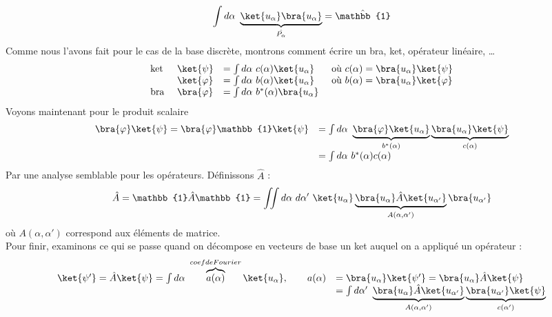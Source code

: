 \begin{equation}
\int d\alpha\ \underbrace{\ket{u_\alpha}\bra{u_\alpha}}_{\hat{P_\alpha}} = \hat{
\mathbb{1}}
\end{equation}
Comme nous l'avons fait pour le cas de la base discrète, montrons comment écrire 
un bra, ket, opérateur linéaire, \dots
\begin{equation}
\begin{array}{llll}
\text{ket } & \ket{\psi} &= \int d\alpha\ c(\alpha)\ket{u_\alpha} & \text{ où } 
c(\alpha) = \bra{u_\alpha}\ket{\psi}\\
& \ket{\varphi} &= \int d\alpha\ b(\alpha)\ket{u_\alpha} & \text{ où } b(\alpha) 
= \bra{u_\alpha}\ket{\varphi}\\
\text{bra } & \bra{\varphi} &= \int d\alpha\ b^*(\alpha)\bra{u_\alpha}
\end{array}
\end{equation}
Voyons maintenant pour le produit scalaire
\begin{equation}
\begin{array}{ll}
\bra{\varphi}\ket{\psi} = \bra{\varphi}\mathbb{1}\ket{\psi} &= \int d\alpha\ 
\underbrace{\bra{\varphi}\ket{u_\alpha}}_{b^*(\alpha)}\underbrace{\bra{u_\alpha}
\ket{\psi}}_{c(\alpha)}\\
&= \int d\alpha\ b^*(\alpha)c(\alpha)
\end{array}
\end{equation}
Par une analyse semblable pour les opérateurs. 
Définissons $\hat{A}$ :
\begin{equation}
\hat{A} = \mathbb{1}\hat{A}\mathbb{1} = \iint d\alpha\ d\alpha'\ \ket{u_\alpha}
\underbrace{\bra{u_\alpha}\hat{A}\ket{u_{\alpha'}}}_{A(\alpha,\alpha')}\bra{u_{\alpha'}}
\end{equation}
où $A(\alpha,\alpha')$ correspond aux éléments de matrice. \\
Pour finir, examinons ce qui se passe quand on décompose en vecteurs de base un ket
auquel on a appliqué un opérateur :
\begin{equation}
\begin{array}{ll}
\ket{\psi'} = \hat{A}\ket{\psi} = \int d\alpha\ \overbrace{a(\alpha)}^{coef de Fourier}\ket{u_\alpha},
\qquad a(\alpha) &= \bra{u_\alpha}\ket{\psi'} = \bra{u_\alpha}\hat{A}\ket{\psi}\\
&= \int d\alpha'\ \underbrace{\bra{u_\alpha}\hat{A}\ket{u_{\alpha'}}}_{A(\alpha,
\alpha')}\underbrace{\bra{u_{\alpha'}}\ket{\psi}}_{c(\alpha')}
\end{array}
\end{equation}
